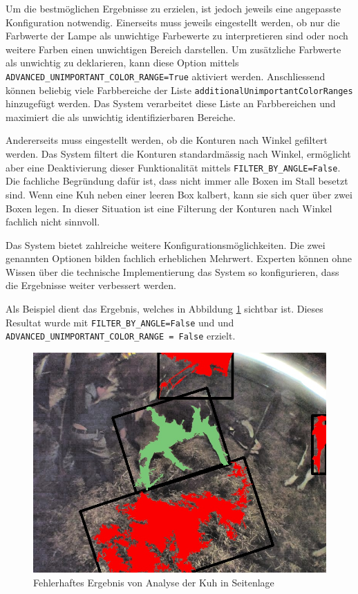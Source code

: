 Um die bestmöglichen Ergebnisse zu erzielen, ist jedoch jeweils eine angepasste Konfiguration notwendig.
Einerseits muss jeweils eingestellt werden, ob nur die Farbwerte der Lampe als unwichtige Farbewerte zu interpretieren sind oder noch weitere Farben einen unwichtigen Bereich darstellen. Um zusätzliche Farbwerte als unwichtig zu deklarieren, kann diese Option mittels \texttt{ADVANCED_UNIMPORTANT_COLOR_RANGE=True} aktiviert werden. Anschliessend können beliebig viele Farbbereiche der Liste \texttt{additionalUnimportantColorRanges} hinzugefügt werden. Das System verarbeitet diese Liste an Farbbereichen und maximiert die als unwichtig identifizierbaren Bereiche.

Andererseits muss eingestellt werden, ob die Konturen nach Winkel gefiltert werden. Das System filtert die Konturen standardmässig nach Winkel, ermöglicht aber eine Deaktivierung dieser Funktionalität mittels \texttt{FILTER_BY_ANGLE=False}. Die fachliche Begründung dafür ist, dass nicht immer alle Boxen im Stall besetzt sind. Wenn eine Kuh neben einer leeren Box kalbert, kann sie sich quer über zwei Boxen legen. In dieser Situation ist eine Filterung der Konturen nach Winkel fachlich nicht sinnvoll.

Das System bietet zahlreiche weitere Konfigurationsmöglichkeiten. Die zwei genannten Optionen bilden fachlich  erheblichen Mehrwert. Experten können ohne Wissen über die technische Implementierung das System so konfigurieren, dass die Ergebnisse weiter verbessert werden. 

Als Beispiel dient das Ergebnis, welches in Abbildung \ref{fig: Fehlerhaftes Ergebnis von Analyse der Kuh in Seitenlage} sichtbar ist. Dieses Resultat wurde mit \texttt{FILTER_BY_ANGLE=False} und und \texttt{ADVANCED_UNIMPORTANT_COLOR_RANGE = False} erzielt. 
\begin{figure}[H]
	\center
	\includegraphics[scale=0.5]{Grafiken/resultate/resultatFehlerhaft.jpg}
	\caption{Fehlerhaftes Ergebnis von Analyse der Kuh in Seitenlage} 
	\label{fig: Fehlerhaftes Ergebnis von Analyse der Kuh in Seitenlage} 
\end{figure}


